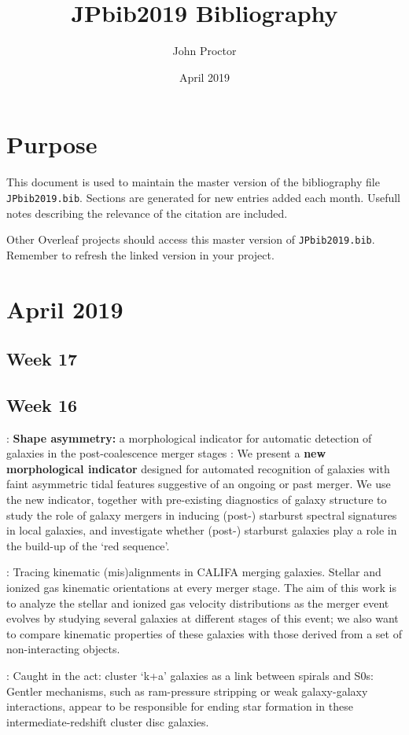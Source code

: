 \documentclass[ceqn,usenatbib,onecolumn]{mnras}
\title{JPbib2019 Bibliography}
\author{John Proctor}
\date{April 2019}
\begin{document}
\maketitle

\section{Purpose}
This document is used to maintain the master version of the bibliography file \texttt{JPbib2019.bib}. Sections are generated for new entries added each month. Usefull notes describing the relevance of the citation are included.
\par Other Overleaf projects should access this master version of \texttt{JPbib2019.bib}. Remember to refresh the linked version in your project.

\section{April 2019}
\subsection{Week 17}
\par
\subsection{Week 16}
\par \citet{10.1093/mnras/stv2878} : {\textbf{Shape asymmetry:} a morphological indicator for automatic detection of galaxies in the post-coalescence merger stages} : We present a \textbf{new morphological indicator} designed for automated recognition of galaxies with faint asymmetric tidal features suggestive of an ongoing or past merger. We use the new indicator, together with pre-existing diagnostics of galaxy structure to study the role of galaxy mergers in inducing (post-) starburst spectral signatures in local galaxies, and investigate whether (post-) starburst galaxies play a role in the build-up of the ‘red sequence’.
\par \citet{2015A&A...582A..21B} : {Tracing kinematic (mis)alignments in CALIFA merging galaxies. Stellar and ionized gas kinematic orientations at every merger stage}. The aim of this work is to analyze the stellar and ionized gas velocity distributions as the merger event evolves by studying several galaxies at different stages of this event; we also want to compare kinematic properties of these galaxies with those derived from a set of non-interacting objects. 
\par \citet{2014MNRAS.438.1038R}: {Caught in the act: cluster `k+a' galaxies as a link between spirals and S0s}: Gentler mechanisms, such as ram-pressure stripping or weak galaxy-galaxy interactions, appear to be responsible for ending star formation in these intermediate-redshift cluster disc galaxies.
\end{document}

